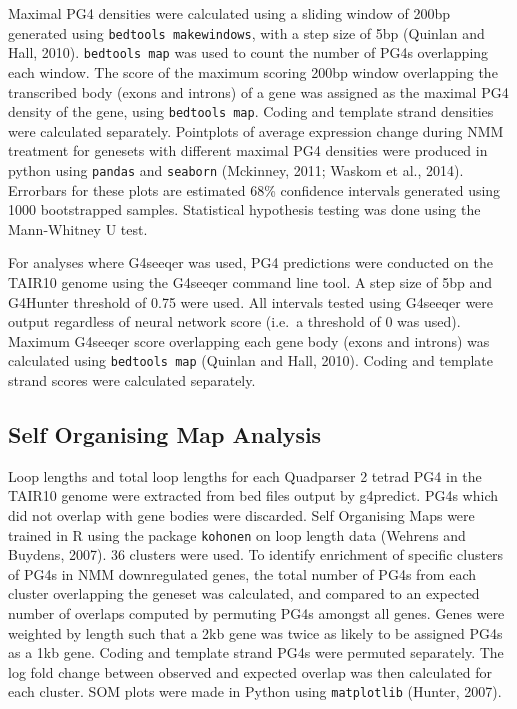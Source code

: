 \documentclass[12pt,a4paper,]{report}
\begin{document}
Maximal PG4 densities were calculated using a sliding window of 200bp
generated using \texttt{bedtools\ makewindows}, with a step size of 5bp
(Quinlan and Hall, 2010). \texttt{bedtools\ map} was used to count the
number of PG4s overlapping each window. The score of the maximum scoring
200bp window overlapping the transcribed body (exons and introns) of a
gene was assigned as the maximal PG4 density of the gene, using
\texttt{bedtools\ map}. Coding and template strand densities were
calculated separately. Pointplots of average expression change during
NMM treatment for genesets with different maximal PG4 densities were
produced in python using \texttt{pandas} and \texttt{seaborn} (Mckinney,
2011; Waskom et al., 2014). Errorbars for these plots are estimated 68\%
confidence intervals generated using 1000 bootstrapped samples.
Statistical hypothesis testing was done using the Mann-Whitney U test.

For analyses where G4seeqer was used, PG4 predictions were conducted on
the TAIR10 genome using the G4seeqer command line tool. A step size of
5bp and G4Hunter threshold of 0.75 were used. All intervals tested using
G4seeqer were output regardless of neural network score (i.e.~a
threshold of 0 was used). Maximum G4seeqer score overlapping each gene
body (exons and introns) was calculated using \texttt{bedtools\ map}
(Quinlan and Hall, 2010). Coding and template strand scores were
calculated separately.

\hypertarget{self-organising-map-analysis}{%
\subsection{Self Organising Map
Analysis}\label{self-organising-map-analysis}}

Loop lengths and total loop lengths for each Quadparser 2 tetrad PG4 in
the TAIR10 genome were extracted from bed files output by g4predict.
PG4s which did not overlap with gene bodies were discarded. Self
Organising Maps were trained in R using the package \texttt{kohonen} on
loop length data (Wehrens and Buydens, 2007). 36 clusters were used. To
identify enrichment of specific clusters of PG4s in NMM downregulated
genes, the total number of PG4s from each cluster overlapping the
geneset was calculated, and compared to an expected number of overlaps
computed by permuting PG4s amongst all genes. Genes were weighted by
length such that a 2kb gene was twice as likely to be assigned PG4s as a
1kb gene. Coding and template strand PG4s were permuted separately. The
log fold change between observed and expected overlap was then
calculated for each cluster. SOM plots were made in Python using
\texttt{matplotlib} (Hunter, 2007).
\end{document}
